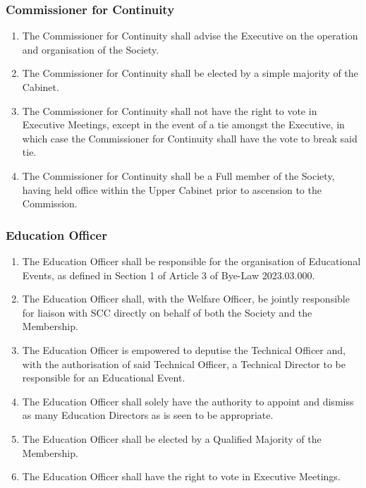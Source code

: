 \documentclass{scrartcl}
\begin{document}
            \subsubsection{Commissioner for Continuity}
                \label{executive--positions--continuity-commissioner}
                \begin{enumerate}
                    \item The Commissioner for Continuity shall advise the Executive on the operation and organisation of the Society.
                    \item The Commissioner for Continuity shall be elected by a simple majority of the Cabinet.
                    \item The Commissioner for Continuity shall not have the right to vote in Executive Meetings, except in the event of a tie amongst the Executive, in which case the Commissioner for Continuity shall have the vote to break said tie.
                    \item The Commissioner for Continuity shall be a Full member of the Society, having held office within the Upper Cabinet prior to ascension to the Commission.
                \end{enumerate}

            \subsubsection{Education Officer}
                \label{executive--positions--education-officer}
                \begin{enumerate}
                    \item The Education Officer shall be responsible for the organisation of Educational Events, as defined in Section 1 of Article 3 of Bye-Law 2023.03.000.
                    \item The Education Officer shall, with the Welfare Officer, be jointly responsible for liaison with SCC directly on behalf of both the Society and the Membership.
                    \item The Education Officer is empowered to deputise the Technical Officer and, with the authorisation of said Technical Officer, a Technical Director to be responsible for an Educational Event.
                    \item The Education Officer shall solely have the authority to appoint and dismiss as many Education Directors as is seen to be appropriate.
                    \item The Education Officer shall be elected by a Qualified Majority of the Membership.
                    \item The Education Officer shall have the right to vote in Executive Meetings.
                \end{enumerate}
\end{document}
